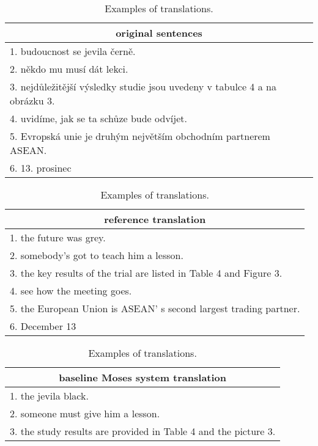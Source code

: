 \documentclass{ExcelAtFIT}
\begin{document}
\begin{table}[h!]
	\caption{Examples of translations.}
	\label{table:originalExamples}
    \begin{center}
        \begin{tabular}{p{1\linewidth}}
          \toprule
          \multicolumn{1}{c}{original sentences} \\
          \midrule
          1. budoucnost se jevila černě. \\
          2. někdo mu musí dát lekci. \\
          3. nejdůležitější výsledky studie jsou uvedeny v tabulce 4 a na obrázku 3. \\
          4. uvidíme, jak se ta schůze bude odvíjet. \\
          5. Evropská unie je druhým největším obchodním partnerem ASEAN. \\
          6. 13. prosinec \\
          \bottomrule
        \end{tabular}
    \end{center}
    \begin{center}
        \begin{tabular}{p{1\linewidth}}
          \toprule
          \multicolumn{1}{c}{reference translation} \\
          \midrule
          1. the future was grey. \\
          2. somebody's got to teach him a lesson. \\
          3. the key results of the trial are listed in Table 4 and Figure 3. \\
          4. see how the meeting goes. \\
          5. the European Union is ASEAN' s second largest trading partner. \\
          6. December 13 \\
          \bottomrule
        \end{tabular}
    \end{center}
    \begin{center}
        \begin{tabular}{p{1\linewidth}}
          \toprule
          \multicolumn{1}{c}{baseline Moses system translation} \\
          \midrule
          1. the jevila black.  \\
          2. someone must give him a lesson.  \\
          3. the study results are provided in Table 4 and the picture 3. \\

\end{tabular}
\end{center}
\end{table}
\end{document}

